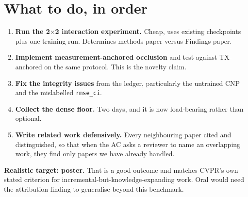 \documentclass[10pt,a4paper]{article}
\begin{document}
\section{What to do, in order}

\begin{enumerate}
\item \textbf{Run the 2$\times$2 interaction experiment.} Cheap, uses existing
checkpoints plus one training run. Determines methods paper versus Findings paper.
\item \textbf{Implement measurement-anchored occlusion} and test against TX-anchored on
the same protocol. This is the novelty claim.
\item \textbf{Fix the integrity issues} from the ledger, particularly the untrained CNP
and the mislabelled \texttt{rmse\_ci}.
\item \textbf{Collect the dense floor.} Two days, and it is now load-bearing rather than
optional.
\item \textbf{Write related work defensively.} Every neighbouring paper cited and
distinguished, so that when the AC asks a reviewer to name an overlapping work, they find
only papers we have already handled.
\end{enumerate}

\textbf{Realistic target: poster.} That is a good outcome and matches CVPR's own stated
criterion for incremental-but-knowledge-expanding work. Oral would need the attribution
finding to generalise beyond this benchmark.
\end{document}
